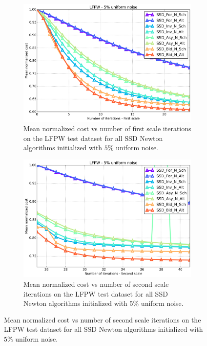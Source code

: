 \begin{figure}[p]
	\par\bigskip\bigskip
	\begin{subfigure}{0.48\textwidth}
	    \includegraphics[width=\textwidth]{experiments/algorithms/ssd_n/mean_cost_vs_iters1_ssd_n_5.png}
	    \caption{Mean normalized cost vs number of first scale iterations on the LFPW test dataset for all SSD Newton algorithms initialized with $5\%$ uniform noise.}
	    \label{fig:mean_cost_vs_iters1_ssd_n_5}
	\end{subfigure}
	\hfill
	\begin{subfigure}{0.48\textwidth}
	    \includegraphics[width=\textwidth]{experiments/algorithms/ssd_n/mean_cost_vs_iters2_ssd_n_5.png}
	    \caption{Mean normalized cost vs number of second scale iterations on the LFPW test dataset for all SSD Newton algorithms initialized with $5\%$ uniform noise.}

\end{subfigure}
\end{figure}

